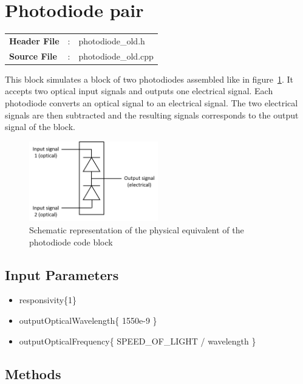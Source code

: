 \clearpage

\section{Photodiode pair}

\begin{tcolorbox}	
	\begin{tabular}{p{2.75cm} p{0.2cm} p{10.5cm}} 	
		\textbf{Header File}   &:& photodiode\_old.h \\
		\textbf{Source File}   &:& photodiode\_old.cpp \\
	\end{tabular}
\end{tcolorbox}


This block simulates a block of two photodiodes assembled like in figure~\ref{photodiode}. It accepts two optical input signals and outputs one electrical signal. Each photodiode converts an optical signal to an electrical signal. The two electrical signals are then subtracted and the resulting signals corresponds to the output signal of the block.

\begin{figure}[h]
	\centering\includegraphics[width=0.5\textwidth]{./lib/photodiode/figures/photodiode.png}
	\caption{Schematic representation of the physical equivalent of the photodiode code block}\label{photodiode}
\end{figure}

\subsection*{Input Parameters}

\begin{itemize}
	\item responsivity\{1\}
	\item outputOpticalWavelength\{ 1550e-9 \}
	\item outputOpticalFrequency\{ SPEED\_OF\_LIGHT / wavelength \}
\end{itemize}

\subsection*{Methods}
 
